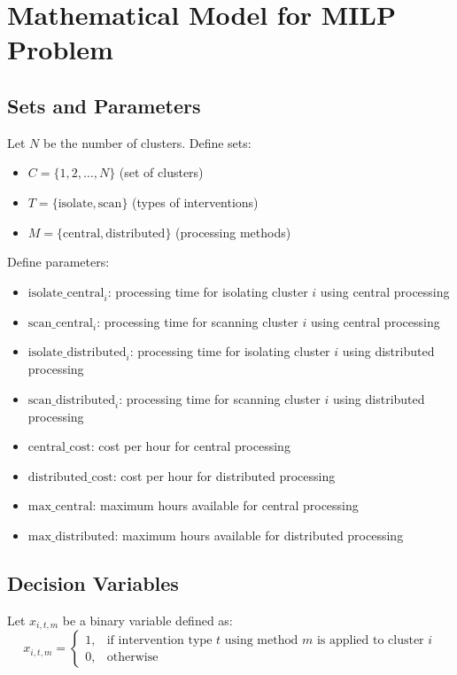 \documentclass{article}
\begin{document}
\section*{Mathematical Model for MILP Problem}

\subsection*{Sets and Parameters}
Let \( N \) be the number of clusters.  
Define sets:
\begin{itemize}
    \item \( C = \{1, 2, \ldots, N\} \) (set of clusters)
    \item \( T = \{ \text{isolate}, \text{scan} \} \) (types of interventions)
    \item \( M = \{ \text{central}, \text{distributed} \} \) (processing methods)
\end{itemize}

Define parameters:
\begin{itemize}
    \item \( \text{isolate\_central}_i \): processing time for isolating cluster \( i \) using central processing
    \item \( \text{scan\_central}_i \): processing time for scanning cluster \( i \) using central processing
    \item \( \text{isolate\_distributed}_i \): processing time for isolating cluster \( i \) using distributed processing
    \item \( \text{scan\_distributed}_i \): processing time for scanning cluster \( i \) using distributed processing
    \item \( \text{central\_cost} \): cost per hour for central processing
    \item \( \text{distributed\_cost} \): cost per hour for distributed processing
    \item \( \text{max\_central} \): maximum hours available for central processing
    \item \( \text{max\_distributed} \): maximum hours available for distributed processing
\end{itemize}

\subsection*{Decision Variables}
Let \( x_{i,t,m} \) be a binary variable defined as:
\[
x_{i,t,m} =
\begin{cases}
1, & \text{if intervention type } t \text{ using method } m \text{ is applied to cluster } i\\
0, & \text{otherwise}
\end{cases}
\]
\end{document}
